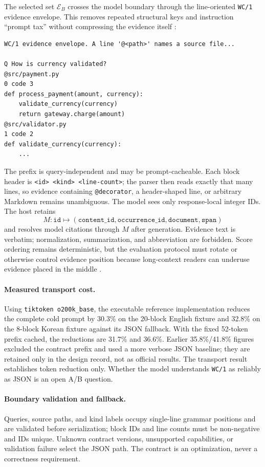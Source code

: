 The selected set $\mathcal{E}_B$ crosses the model boundary through the
line-oriented \texttt{WC/1} evidence envelope. This removes repeated structural
keys and instruction ``prompt tax'' without compressing the evidence itself
\citep{matveev2026toon}:

\begin{verbatim}
WC/1 evidence envelope. A line '@<path>' names a source file...

Q How is currency validated?
@src/payment.py
0 code 3
def process_payment(amount, currency):
    validate_currency(currency)
    return gateway.charge(amount)
@src/validator.py
1 code 2
def validate_currency(currency):
    ...
\end{verbatim}

The prefix is query-independent and may be prompt-cacheable. Each block header
is \texttt{<id> <kind> <line-count>}; the parser then reads exactly that many
lines, so evidence containing \texttt{@decorator}, a header-shaped line, or
arbitrary Markdown remains unambiguous. The model sees only response-local
integer IDs. The host retains
\[
M:\texttt{id}\mapsto
(\texttt{content\_id},\texttt{occurrence\_id},\texttt{document},\texttt{span})
\]
and resolves model citations through $M$ after generation. Evidence text is
verbatim; normalization, summarization, and abbreviation are forbidden.
Score ordering remains deterministic, but the evaluation protocol must rotate
or otherwise control evidence position because long-context readers can
underuse evidence placed in the middle \citep{liu2024lostmiddle}.

\paragraph{Measured transport cost.}
Using \texttt{tiktoken o200k\_base}, the executable reference implementation
reduces the complete cold prompt by 30.3\% on the 20-block English fixture and
32.8\% on the 8-block Korean fixture against its JSON fallback. With the fixed
52-token prefix cached, the reductions are 31.7\% and 36.6\%. Earlier
35.8\%/41.8\% figures excluded the contract prefix and used a more verbose JSON
baseline; they are retained only in the design record, not as official results.
The transport result establishes token reduction only. Whether the model
understands \texttt{WC/1} as reliably as JSON is an open A/B question.

\paragraph{Boundary validation and fallback.}
Queries, source paths, and kind labels occupy single-line grammar positions and
are validated before serialization; block IDs and line counts must be
non-negative and IDs unique. Unknown contract versions, unsupported
capabilities, or validation failure select the JSON path. The contract is an
optimization, never a correctness requirement.

